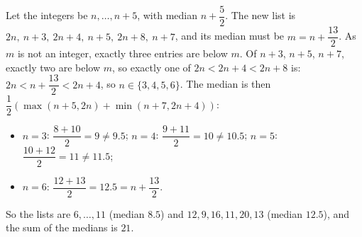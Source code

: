 Let the integers be $n,\dots,n+5$, with median $n+\dfrac52$. The new list is $2n,\ n+3,\ 2n+4,\ n+5,\ 2n+8,\ n+7$, and its median must be $m=n+\dfrac{13}{2}$. As $m$ is not an integer, exactly three entries are below $m$. Of $n+3$, $n+5$, $n+7$, exactly two are below $m$, so exactly one of $2n<2n+4<2n+8$ is: $2n<n+\dfrac{13}2<2n+4$, so $n\in\{3,4,5,6\}$. The median is then $\dfrac12\left(\max(n+5,2n)+\min(n+7,2n+4)\right)$:
\begin{itemize}
\item $n=3$: $\dfrac{8+10}{2}=9\ne9.5$; \quad $n=4$: $\dfrac{9+11}{2}=10\ne10.5$; \quad $n=5$: $\dfrac{10+12}{2}=11\ne11.5$;
\item $n=6$: $\dfrac{12+13}{2}=12.5=n+\dfrac{13}{2}$. \checkmark
\end{itemize}
So the lists are $6,\dots,11$ (median $8.5$) and $12,9,16,11,20,13$ (median $12.5$), and the sum of the medians is $\boxed{21}$.
